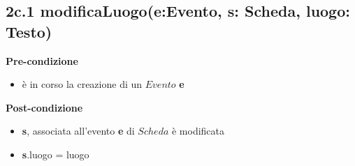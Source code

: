 \documentclass[12pt]{extarticle}
\begin{document}
%
%
%
%

\subsection*{2c.1 modificaLuogo(e:Evento, s: Scheda, luogo: Testo)}

\textbf{Pre-condizione}
\begin{itemize}
  \item è in corso la creazione di un $Evento$ \textbf{e}
\end{itemize} 
\textbf{Post-condizione}
\begin{itemize}
  \item \textbf{s}, associata all'evento \textbf{e} di $Scheda$ è modificata
  \item \textbf{s}.luogo = luogo
\end{itemize} 
\end{document}
